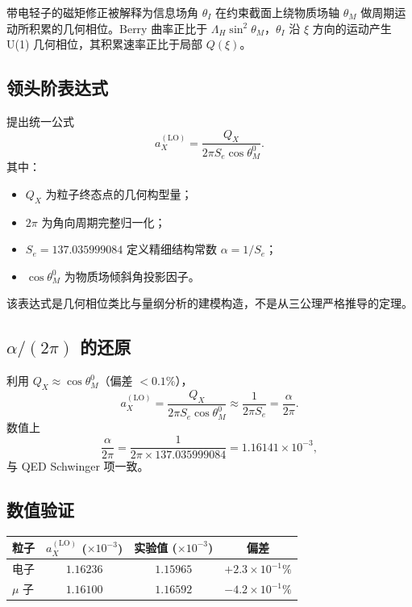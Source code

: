 \documentclass[12pt,a4paper]{article}
\theoremstyle{definition}
\begin{document}
带电轻子的磁矩修正被解释为信息场角 $\theta_I$ 在约束截面上绕物质场轴 $\theta_M$ 做周期运动所积累的几何相位。Berry 曲率正比于 $\Lambda_H\sin^2\theta_M$，$\theta_I$ 沿 $\xi$ 方向的运动产生 U(1) 几何相位，其积累速率正比于局部 $Q(\xi)$。

\subsection{领头阶表达式}

提出统一公式
\begin{equation}
\boxed{a_X^{(\mathrm{LO})}=\frac{Q_X}{2\pi S_e\cos\theta_M^0}.}
\end{equation}
其中：
\begin{itemize}
\item $Q_X$ 为粒子终态点的几何构型量；
\item $2\pi$ 为角向周期完整归一化；
\item $S_e=137.035999084$ 定义精细结构常数 $\alpha=1/S_e$；
\item $\cos\theta_M^0$ 为物质场倾斜角投影因子。
\end{itemize}
该表达式是几何相位类比与量纲分析的建模构造，不是从三公理严格推导的定理。

\subsection{$\alpha/(2\pi)$ 的还原}

利用 $Q_X\approx\cos\theta_M^0$（偏差 $<0.1\%$），
\begin{equation}
a_X^{(\mathrm{LO})}=\frac{Q_X}{2\pi S_e\cos\theta_M^0}\approx\frac{1}{2\pi S_e}=\frac{\alpha}{2\pi}.
\end{equation}
数值上
\begin{equation}
\frac{\alpha}{2\pi}=\frac{1}{2\pi\times137.035999084}=1.16141\times10^{-3},
\end{equation}
与 QED Schwinger 项一致。

\subsection{数值验证}

\begin{center}
\begin{tabular}{@{}lccc@{}}
\toprule
粒子 & $a_X^{(\mathrm{LO})}$ ($\times10^{-3}$) & 实验值 ($\times10^{-3}$) & 偏差 \\
\midrule
电子 & $1.16236$ & $1.15965$ & $+2.3\times10^{-1}\%$ \\
$\mu$ 子 & $1.16100$ & $1.16592$ & $-4.2\times10^{-1}\%$ \\
\bottomrule
\end{tabular}
\end{center}
\end{document}
